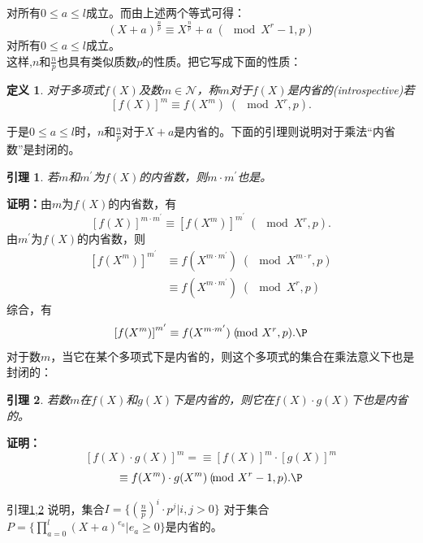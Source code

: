 \documentclass[a4paper]{article}
\newtheorem{lemma}{引理}[section]
\newtheorem{definition}{定义}[section]
\numberwithin{equation}{section}
\begin{document}
\begin{multicols}{2}
  对所有$0\le a\le \mathit{l}$成立。而由上述两个等式可得：
\begin{equation}
   (X+a)^{\frac{n}{p}}\equiv X^{\frac{n}{p}}+a\;(\!\!\!\!\!\mod{X^r-1,p})
\end{equation}
  对所有$0\le a\le \mathit{l}$成立。\\
  这样,$n$和$\frac{n}{p}$也具有类似质数$p$的性质。把它写成下面的性质：
  \begin{definition}
    \upshape 对于多项式$f(X)$及数$m\in\mathcal{N}$，称$m$对于$f(X)$是内省的(introspective)若
    \[\left[f(X)\right]^m\equiv f(X^m)\;(\!\!\!\!\!\mod{X^r,p}).\]
  \end{definition}
  于是$0\le a\le \mathit{l}$时，$n$和$\frac{n}{p}$对于$X+a$是内省的。下面的引理则说明对于乘法``内省数''是封闭的。
  \begin{lemma}\label{introspectiveN}
    \upshape 若$m$和$m^\prime$为$f(X)$的内省数，则$m\cdot m^\prime$也是。
  \end{lemma}
  \textbf{证明：}由$m$为$f(X)$的内省数，有
\begin{equation}
   \left[f(X)\right]^{m\cdot m^\prime}\equiv\left[f(X^m)\right]^{m^\prime}\;(\!\!\!\!\!\mod{X^r,p}).
\end{equation}
  由$m^\prime$为$f(X)$的内省数，则
\begin{equation}
 \begin{split}
  \left[f(X^m)\right]^{m^\prime}&\equiv  f(X^{m\cdot m^\prime})\;(\!\!\!\!\!\mod{X^{m\cdot r},p})\\
  & \equiv f(X^{m\cdot m^\prime})\; (\!\!\!\!\!\mod{X^r,p})
 \end{split}
\end{equation}
  综合，有
\begin{equation}
 \left[f(X^m)\right]^{m^\prime}\equiv f(X^{m\cdot m^\prime})\;
  (\!\!\!\!\!\mod{X^r,p}).\P
\end{equation}
  对于数$m$，当它在某个多项式下是内省的，则这个多项式的集合在乘法意义下也是封闭的：
  \begin{lemma}\label{introspectiveP}
    \upshape 若数$m$在$f(X)$和$g(X)$下是内省的，则它在$f(X)\cdot g(X)$下也是内省的。
  \end{lemma}
  \textbf{证明：}\[\left[f(X)\cdot g(X)\right]^m=\equiv\left[f(X)\right]^m\cdot\left[g(X)\right]^m\]
  \[\equiv f(X^m)\cdot g(X^m)\:(\!\!\!\!\!\mod{X^r-1,p}).\P\]

  引理\ref{introspectiveN},\ref{introspectiveP} 说明，集合$I=\{\left(\frac{n}{p}\right)^i\cdot p^j|i,j>0\}$
  对于集合$P=\{\prod_{a=0}^\mathit{l}\left(X+a\right)^{e_a}|e_a\ge 0\}$是内省的。\\[0.2cm]
  

\end{multicols}
\end{document}
